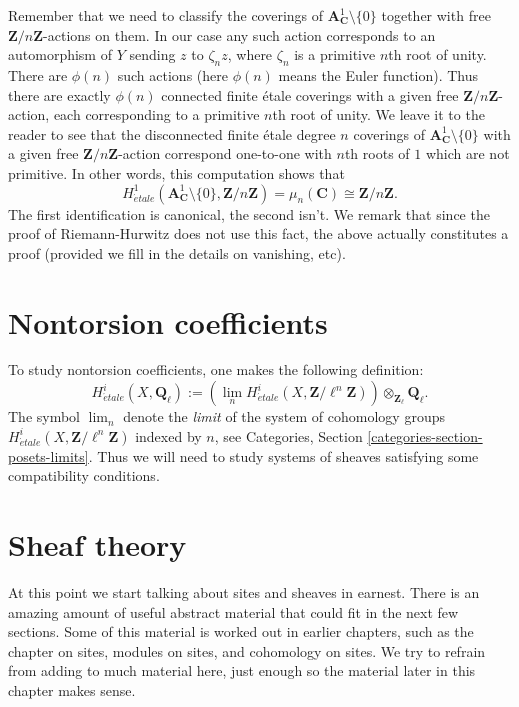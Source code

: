 \medskip\noindent
Remember that we need to classify the coverings of
${\mathbf{A}^1_\mathbf{C} \setminus \{0\}}$ together with free
$\mathbf{Z}/n\mathbf{Z}$-actions on them.
In our case any such action corresponds
to an automorphism of $Y$ sending $z$ to $\zeta_n z$, where $\zeta_n$ is a
primitive $n$th root of unity. There are $\phi(n)$ such actions
(here $\phi(n)$ means the Euler function). Thus there are exactly
$\phi(n)$ connected finite \'etale coverings with a given free
$\mathbf{Z}/n\mathbf{Z}$-action, each corresponding to a primitive
$n$th root of unity. We leave it to the reader to see that the
disconnected finite \'etale degree $n$ coverings of
$\mathbf{A}^1_{\mathbf{C}} \setminus \{0\}$ with a given free
$\mathbf{Z}/n\mathbf{Z}$-action correspond one-to-one with $n$th
roots of $1$ which are not primitive.
In other words, this computation shows that
$$
H_{\acute{e}tale}^1 (\mathbf{A}^1_\mathbf{C} \setminus \{0\},
\mathbf{Z}/n\mathbf{Z}) =
\mu_n(\mathbf{C}) \cong \mathbf{Z}/n\mathbf{Z}.
$$
The first identification is canonical, the second isn't. We remark that
since the proof of Riemann-Hurwitz does not use this fact, the above actually
constitutes a proof (provided we fill in the details on vanishing, etc).




\section{Nontorsion coefficients}
\label{section-nontorsion}

\noindent
To study nontorsion coefficients, one makes the following definition:
$$
H_{\acute{e}tale}^i (X, \mathbf{Q}_\ell) :=
\left( \lim_n H_{\acute{e}tale}^i(X, \mathbf{Z}/\ell^n\mathbf{Z}) \right)
\otimes_{\mathbf{Z}_\ell} \mathbf{Q}_\ell.
$$
The symbol $\lim_n$ denote the {\it limit} of the system of
cohomology groups $H_{\acute{e}tale}^i(X, \mathbf{Z}/\ell^n\mathbf{Z})$ indexed
by $n$, see
Categories, Section \ref{categories-section-posets-limits}.
Thus we will need to study systems of sheaves satisfying some compatibility
conditions.




\section{Sheaf theory}
\label{section-sheaf-theory}

\noindent
At this point we start talking about sites and sheaves in earnest.
There is an amazing amount of useful abstract material that could fit
in the next few sections. Some of this material is worked out in earlier
chapters, such as the chapter on sites, modules on sites, and cohomology
on sites. We try to refrain from adding to much material here, just
enough so the material later in this chapter makes sense.




